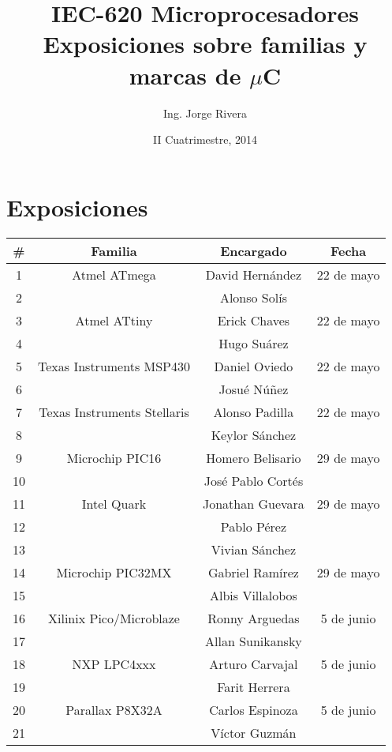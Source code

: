 \documentclass[letterpaper,10pt]{article}
\title{IEC-620 Microprocesadores\\ Exposiciones sobre familias y marcas de $\mu$C}
\author{Ing. Jorge Rivera}
\date{II Cuatrimestre, 2014}
\begin{document}
\maketitle

\section{Exposiciones}

\begin{center}
\begin{tabular}{|c|c|c|c|}\hline
\#  & Familia 					& Encargado				& Fecha  \\ \hline\hline
1   & Atmel ATmega 			 	& David Hernández	& 22 de mayo\\
2   & 					 		& Alonso Solís		& 	\\\hline
3   & Atmel ATtiny		 		& Erick Chaves  	& 22 de mayo	\\
4   &  				 			& Hugo Suárez		& 	\\\hline
5   & Texas Instruments MSP430	& Daniel Oviedo		& 22 de mayo	\\
6   &     						& Josué Núñez		& \\\hline
7   & Texas Instruments Stellaris & Alonso Padilla	& 22 de mayo	\\
8   & 							& Keylor Sánchez	& \\\hline
9   & Microchip PIC16 			& Homero Belisario	& 29 de mayo		\\
10  & 							& José Pablo Cortés	& \\ \hline
11  & Intel Quark				& Jonathan Guevara  & 29 de mayo		\\
12  & 							& Pablo Pérez		& 	\\
13  & 							& Vivian Sánchez	& 		\\\hline
14  & Microchip PIC32MX			& Gabriel Ramírez 	& 29 de mayo	\\
15  & 							& Albis Villalobos	& 		\\\hline
16  & Xilinix Pico/Microblaze	& Ronny Arguedas	& 5 de junio	\\
17  & 							& Allan Sunikansky	&  	\\\hline
18  & NXP LPC4xxx				& Arturo Carvajal	& 5 de junio\\
19  & 							& Farit Herrera		& 		\\\hline
20  & Parallax P8X32A			& Carlos Espinoza	& 5 de junio\\
21  &							& Víctor Guzmán		& 		\\\hline
\end{tabular}
\end{center}
\end{document}
